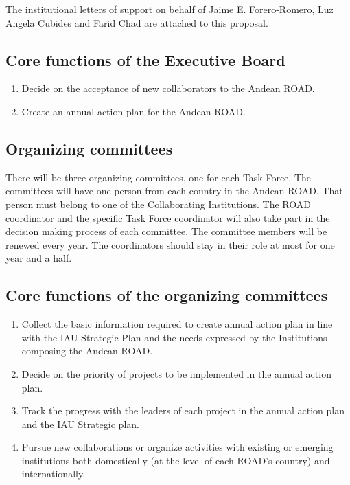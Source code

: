 \documentclass[12pt]{article}
\begin{document}
\noindent
The institutional letters of support on behalf of Jaime
E. Forero-Romero, Luz Angela Cubides and Farid Chad are attached to this
proposal. 


\subsection*{Core functions of the Executive Board}

\begin{enumerate}
\item Decide on the acceptance of new collaborators to the Andean ROAD.
\item Create an annual action plan for the Andean ROAD.
\end{enumerate}


\subsection*{Organizing committees}


There will be three organizing committees, one for each Task
Force. The committees will have one person from each country in the
Andean ROAD. That person must belong to one of the Collaborating
Institutions. The ROAD coordinator and the specific Task Force
coordinator will also take part in the decision making process of each
committee. The committee members will be renewed every year. The
coordinators should stay in their role at most for one year and a
half. 

\subsection*{Core functions of the organizing committees}
\begin{enumerate}
\item Collect the basic information required to create annual action
  plan in line with the IAU Strategic Plan and the needs expressed by
  the Institutions composing the Andean ROAD. 
\item Decide on the priority of projects to be implemented in the
  annual action plan. 
\item Track the progress with the leaders of each project in the
  annual action plan and the IAU Strategic plan. 
\item Pursue new collaborations or organize activities with existing
  or emerging institutions both domestically (at the level of each
  ROAD’s country) and internationally. 
 \end{enumerate}
\end{document}
